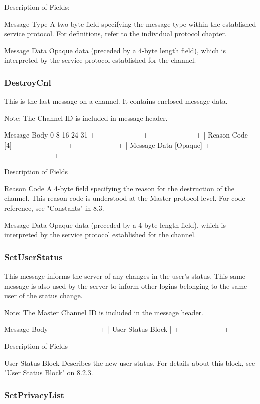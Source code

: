 \documentclass[titlepage,oneside]{book}
\begin{document}
Description of Fields:

Message Type
  A two-byte field specifying the message type within the established
  service protocol. For definitions, refer to the individual protocol
  chapter.

Message Data
  Opaque data (preceded by a 4-byte length field), which is
  interpreted by the service protocol established for the channel.

\subsubsection{DestroyCnl}

This is the last message on a channel. It contains enclosed message
data.

Note: The Channel ID is included in message header.

Message Body
0         8         16        24      31
+---------+---------+---------+---------+
|            Reason Code [4]            |
+-------------------+-------------------+
| Message Data [Opaque]
+-------------------+-------------------+

Description of Fields

Reason Code
  A 4-byte field specifying the reason for the destruction of the
  channel. This reason code is understood at the Master protocol level.
  For code reference, see "Constants" in 8.3.

Message Data
  Opaque data (preceded by a 4-byte length field), which is
  interpreted by the service protocol established for the channel.

\subsubsection{SetUserStatus}

This message informs the server of any changes in the user's status.
This same message is also used by the server to inform other logins
belonging to the same user of the status change.

Note: The Master Channel ID is included in the message header.

Message Body
+-------------------+
| User Status Block |
+-------------------+

Description of Fields

User Status Block
  Describes the new user status. For details about this block, see
  "User Status Block" on 8.2.3.

\subsubsection{SetPrivacyList}
\end{document}
